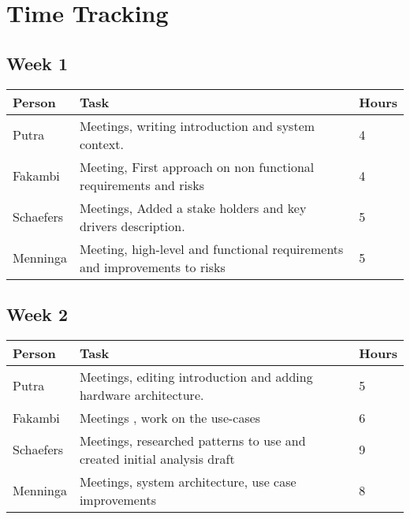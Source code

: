 \chapter{Time Tracking}
\label{App: Time Tracking}

\section*{Week 1}


\begin{longtable}{p{} p{} p{}}
	\textbf{Person} & \textbf{Task} & \textbf{Hours} \\ \toprule
	Putra           & Meetings, writing introduction and system context.	& 4	\\ \midrule
	Fakambi         & Meeting, First approach on non functional requirements and risks & 4 \\ \midrule
	Schaefers       & Meetings, Added a stake holders and key drivers description.	& 	5 \\ \midrule
	Menninga        & Meeting, high-level and functional requirements and improvements to risks	&	5\\ \bottomrule
\end{longtable}

\section*{Week 2}

\begin{longtable}{p{} p{} p{}}
	\textbf{Person} & \textbf{Task} & \textbf{Hours} \\ \toprule
	Putra           & Meetings, editing introduction and adding hardware architecture.	& 5	\\ \midrule
	Fakambi         & Meetings , work on the use-cases & 6 \\ \midrule
	Schaefers       & Meetings, researched patterns to use and created initial analysis draft & 9\\ \midrule
	Menninga        & Meetings, system architecture, use case improvements & 8 \\ \bottomrule
\end{longtable}

